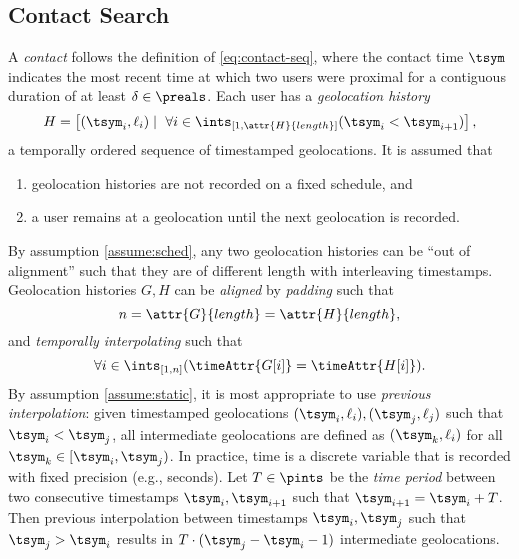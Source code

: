 \subsection{Contact Search}
\newcommand{\histories}{\mathcal{H}}
\newcommand{\locations}{\mathbb{L}}
\newcommand{\locset}{\mathcal{L}}
\newcommand{\latitude}{\phi}
\newcommand{\longitude}{\lambda}
\newcommand{\users}{\mathcal{U}}
\newcommand{\sindex}{\mathcal{I}}
\newcommand{\query}{\mathcal{N}}
\newcommand{\qelement}{q}
\newcommand{\hone}{G}
\newcommand{\htwo}{H}
\newcommand{\neighbors}{N}
A \emph{contact} follows the definition of \eqref{eq:contact-seq}, where the contact time $\tsym$ indicates the most recent time at which two users were proximal for a contiguous duration of at least $\delta \in \preals$. Each user has a \emph{geolocation history}
	\begin{equation*}
		\htwo = \left[(\tsym_i, \ell_i) \mid ~\forall i \in \ints_{[1, \attr{\htwo}{length}]} (\tsym_i < \tsym_{i + 1}) \right],
	\end{equation*}
a temporally ordered sequence of timestamped geolocations. It is assumed that
	\begin{enumerate}
		\item geolocation histories are not recorded on a fixed schedule, and \label{assume:sched}
		\item a user remains at a geolocation until the next geolocation is recorded. \label{assume:static}
	\end{enumerate}
By assumption \ref{assume:sched}, any two geolocation histories can be ``out of alignment'' such that they are of different length with interleaving timestamps. Geolocation histories $\hone, \htwo$ can be \emph{aligned} by \emph{padding} such that
	\begin{equation*}
		n = \attr{\hone}{length} = \attr{\htwo}{length},
	\end{equation*}
and \emph{temporally interpolating} such that
	\begin{equation*}
		\forall i \in \ints_{[1, n]}(\timeAttr{\hone[i]} = \timeAttr{\htwo[i]}).
	\end{equation*}
By assumption \ref{assume:static}, it is most appropriate to use \emph{previous interpolation}: given timestamped geolocations $(\tsym_i, \ell_i), (\tsym_j, \ell_j)$ such that $\tsym_i < \tsym_j$, all intermediate geolocations are defined as $(\tsym_k, \ell_i)$ for all $\tsym_k \in [\tsym_i, \tsym_j)$. In practice, time is a discrete variable that is recorded with fixed precision (e.g., seconds). Let $T \in \pints$ be the \emph{time period} between two consecutive timestamps $\tsym_i, \tsym_{i + 1}$ such that $\tsym_{i + 1} = \tsym_i + T$. Then previous interpolation between timestamps $\tsym_i, \tsym_j$ such that $\tsym_j > \tsym_i$ results in $T \cdot (\tsym_j - \tsym_i - 1)$ intermediate geolocations.

